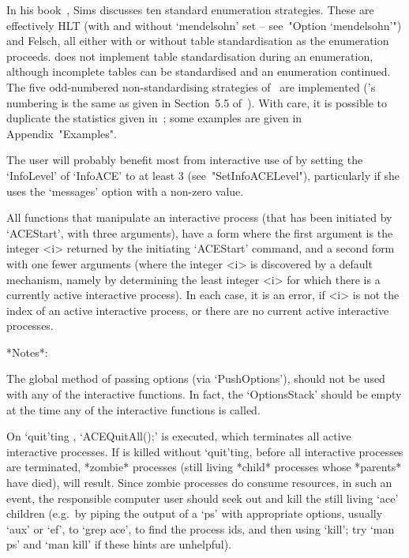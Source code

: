In his book~\cite{Sim94},  Sims  discusses  ten  standard  enumeration
strategies. These are effectively HLT (with and  without  `mendelsohn'
set -- see~"Option `mendelsohn'")  and  Felsch,  all  either  with  or
without table standardisation as the enumeration proceeds. {\ACE} does
not implement table standardisation during  an  enumeration,  although
incomplete tables can be standardised and  an  enumeration  continued.
The five odd-numbered non-standardising strategies of~\cite{Sim94} are
implemented ({\ACE}'s numbering is the same as  given  in  Section~5.5
of~\cite{Sim94}).  With  care,  it  is  possible  to   duplicate   the
statistics  given  in~\cite{Sim94};  some  examples   are   given   in
Appendix~"Examples". %

\enditems


The user will probably benefit most from interactive use of {\ACE}  by
setting   the   `InfoLevel'   of   `InfoACE'    to    at    least    3
(see~"SetInfoACELevel"),  particularly  if  she  uses  the  `messages'
option with a non-zero value.

All functions that manipulate an interactive process  (that  has  been
initiated by `ACEStart', with three arguments), have a form where  the
first  argument  is  the  integer  <i>  returned  by  the   initiating
`ACEStart' command, and a second form with one fewer arguments  (where
the integer <i> is  discovered  by  a  default  mechanism,  namely  by
determining the least integer <i>  for  which  there  is  a  currently
active interactive {\ACE} process). In each case, it is an  error,  if
<i> is not the index of an active interactive process, or there are no
current active interactive processes.

*Notes*: 

The global method of passing options (via `PushOptions'),  should  not
be  used  with  any  of  the  interactive  functions.  In  fact,   the
`OptionsStack' should be empty at the  time  any  of  the  interactive
functions is called.

On `quit'ting {\GAP}, `ACEQuitAll();' is  executed,  which  terminates
all active interactive {\ACE} processes. If {\GAP} is  killed  without
`quit'ting, before all interactive {\ACE}  processes  are  terminated,
*zombie* processes (still living  *child*  processes  whose  *parents*
have died), will result. Since zombie processes do consume  resources,
in such an event, the responsible computer user should  seek  out  and
kill the still living `ace' children (e.g.~by piping the output  of  a
`ps' with appropriate options, usually `aux' or `ef', to  `grep  ace',
to find the process ids, and then using `kill'; try `man ps' and  `man
kill' if these hints are unhelpful).

